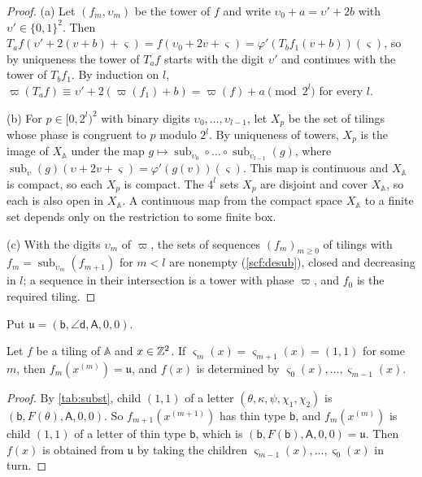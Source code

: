 \begin{proof}
(a) Let $(f_m,\upsilon_m)$ be the tower of $f$ and write $\upsilon_0+a=\upsilon'+2b$ with $\upsilon'\in\{0,1\}^2$. Then $T_af(\upsilon'+2(v+b)+\varsigma)=f(\upsilon_0+2v+\varsigma)=\varphi'(T_bf_1(v+b))(\varsigma)$, so by uniqueness the tower of $T_af$ starts with the digit $\upsilon'$ and continues with the tower of $T_bf_1$. By induction on $l$, $\varpi(T_af)\equiv\upsilon'+2(\varpi(f_1)+b)=\varpi(f)+a\pmod{2^l}$ for every $l$.

(b) For $p\in[0,2^l)^2$ with binary digits $\upsilon_0,\dots,\upsilon_{l-1}$, let $X_p$ be the set of tilings whose phase is congruent to $p$ modulo $2^l$. By uniqueness of towers, $X_p$ is the image of $X_{\mathbb A}$ under the map $g\mapsto\operatorname{sub}_{\upsilon_0}\circ\dots\circ\operatorname{sub}_{\upsilon_{l-1}}(g)$, where $\operatorname{sub}_\upsilon(g)(\upsilon+2v+\varsigma)=\varphi'(g(v))(\varsigma)$. This map is continuous and $X_{\mathbb A}$ is compact, so each $X_p$ is compact. The $4^l$ sets $X_p$ are disjoint and cover $X_{\mathbb A}$, so each is also open in $X_{\mathbb A}$. A continuous map from the compact space $X_{\mathbb A}$ to a finite set depends only on the restriction to some finite box.

(c) With the digits $\upsilon_m$ of $\varpi$, the sets of sequences $(f_m)_{m\ge0}$ of tilings with $f_m=\operatorname{sub}_{\upsilon_m}(f_{m+1})$ for $m<l$ are nonempty (\cref{scf:desub}), closed and decreasing in $l$; a sequence in their intersection is a tower with phase $\varpi$, and $f_0$ is the required tiling.
\end{proof}

Put $\mathfrak u=(\mathsf b,\angle\mathsf d,\mathsf A,0,0)$.

\begin{lemma}[Coincidence]\label{scf:coincidence}
Let $f$ be a tiling of $\mathbb A$ and $x\in\mathbb{Z}^2$. If $\varsigma_m(x)=\varsigma_{m+1}(x)=(1,1)$ for some $m$, then $f_m(x^{(m)})=\mathfrak u$, and $f(x)$ is determined by $\varsigma_0(x),\dots,\varsigma_{m-1}(x)$.
\end{lemma}

\begin{proof}
By \cref{tab:subst}, child $(1,1)$ of a letter $(\theta,\kappa,\psi,\chi_1,\chi_2)$ is $(\mathsf b,F(\theta),\mathsf A,0,0)$. So $f_{m+1}(x^{(m+1)})$ has thin type $\mathsf b$, and $f_m(x^{(m)})$ is child $(1,1)$ of a letter of thin type $\mathsf b$, which is $(\mathsf b,F(\mathsf b),\mathsf A,0,0)=\mathfrak u$. Then $f(x)$ is obtained from $\mathfrak u$ by taking the children $\varsigma_{m-1}(x),\dots,\varsigma_0(x)$ in turn.
\end{proof}

